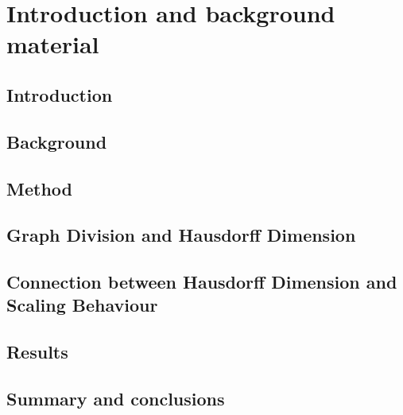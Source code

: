 \documentclass[nocoverpage,swedish,g5paper]{thesis}
\begin{document}
\begin{preface}

\end{preface}

\tableofcontents

\mainmatter

\part{Introduction and background material}

\chapter{Introduction}


\chapter{Background}\label{ch:Background}


\chapter{Method}\label{ch:Method}


\chapter{Graph Division and Hausdorff Dimension}\label{ch:GraphDivisionandHausdorffDim}


\chapter{Connection between Hausdorff Dimension and Scaling Behaviour}\label{ch:HausdorffScaling}


\chapter{Results}\label{ch:Results}


\chapter{Summary and conclusions}\label{ch:Summary}




%



\end{document}
